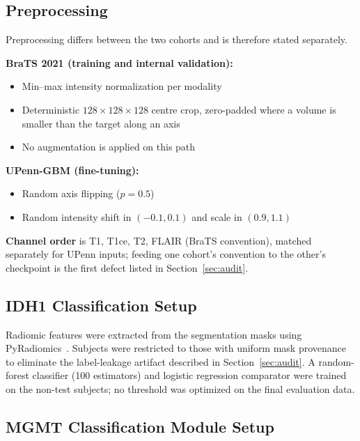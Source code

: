 \documentclass[conference]{IEEEtran}
\begin{document}
\subsection{Preprocessing}

Preprocessing differs between the two cohorts and is therefore stated separately.

\noindent\textbf{BraTS 2021 (training and internal validation):}
\begin{itemize}
    \item Min--max intensity normalization per modality
    \item Deterministic $128\times128\times128$ centre crop, zero-padded where a volume is smaller than the target along an axis
    \item No augmentation is applied on this path
\end{itemize}

\noindent\textbf{UPenn-GBM (fine-tuning):}
\begin{itemize}
    \item Random axis flipping ($p=0.5$)
    \item Random intensity shift in $(-0.1, 0.1)$ and scale in $(0.9, 1.1)$
\end{itemize}

\noindent\textbf{Channel order} is T1, T1ce, T2, FLAIR (BraTS convention), matched separately for UPenn inputs; feeding one cohort's convention to the other's checkpoint is the first defect listed in Section~\ref{sec:audit}.

\subsection{IDH1 Classification Setup}
\label{sec:classification_setup}

Radiomic features were extracted from the segmentation masks using PyRadiomics~\cite{vangriethuysen2017pyradiomics}. Subjects were restricted to those with uniform mask provenance to eliminate the label-leakage artifact described in Section~\ref{sec:audit}. A random-forest classifier (100 estimators) and logistic regression comparator were trained on the non-test subjects; no threshold was optimized on the final evaluation data.

\subsection{MGMT Classification Module Setup}
\label{sec:mgmt_setup}
\end{document}
